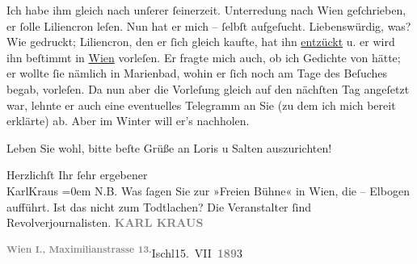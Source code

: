 \pstart
           Ich habe ihm gleich nach unſerer{ }ſeinerzeit. Unterredung nach Wien geſchrieben, er{ }ſolle {\pb}Liliencron leſen. Nun hat er mich –{ }ſelbſt
          aufgeſucht. Liebenswürdig, was? Wie gedruckt; Liliencron, den er{ }ſich gleich kaufte, hat ihn \uline{entzückt} u. er wird ihn beſtimmt in \uline{Wien} vorleſen. Er fragte mich auch, ob ich Gedichte von  hätte; er wollte{ }ſie nämlich in Marienbad, wohin er{ }ſich noch am Tage des Beſuches begab, vorleſen. Da nun aber
          die Vorleſung gleich auf den nächſten Tag angeſetzt war, lehnte er auch eine eventuelles
          Telegramm an Sie (zu dem ich mich bereit erklärte) ab. Aber im Winter will
          er’s nachholen.\pend
           
\pstart
           Leben Sie wohl, bitte beſte Grüße an Loris u Salten auszurichten!\pend
           
\pstart
           Herzlichſt Ihr{ }ſehr ergebener{\\[\baselineskip]}\spacefill\mbox{KarlKraus}\pend
           \leftskip=0em{}
\pstart
           \noindent{}N.B. Was{ }ſagen Sie zur »Freien Bühne« in Wien, die – Elbogen aufführt. Ist das nicht zum Todtlachen? Die Veranstalter{ }ſind
            Revolverjournalisten.\pend
           \vspace{1em}
\pstart
           \noindent{}
\pstart
           {\pb}\textcolor{gray}{\textbf{KARL KRAUS}}\pend
           
\pstart
           \raggedleft{}\substVorne{}\textsuperscript{\textcolor{gray}{\textbf{Wien I., Maximilianstrasse 13.}}}\substDazwischen{}Ischl\substHinten{}{ }15. VII \textcolor{gray}{\textbf{189}}3\pend
           \pend
           
